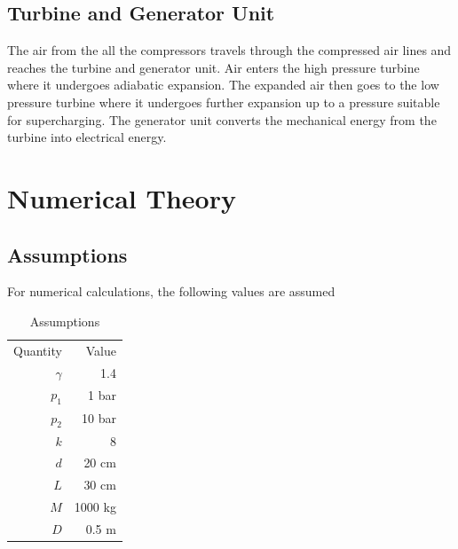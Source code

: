 \documentclass[12pt,a4paper]{article}
\begin{document}
	\subsection{Turbine and Generator Unit}
		The air from the all the compressors travels through the compressed air lines and reaches the turbine and generator unit. Air enters the high pressure turbine where it undergoes adiabatic expansion. The expanded air then goes to the low pressure turbine where it undergoes further expansion up to a pressure suitable for supercharging. The generator unit converts the mechanical energy from the turbine into electrical energy.

\section{Numerical Theory}
	\subsection{Assumptions} \label{sec:numerical_theory_assumptions}
		For numerical calculations, the following values are assumed

		\begin{table}[H]
			\centering
			\begin{tabular}{r r}
				Quantity & Value \\
				\( \gamma \) & 1.4 \\
				\( p_1 \) & 1 bar \\
				\( p_2 \) & 10 bar \\
				\( k \) & 8 \\
				\( d \) & 20 cm \\
				\( L \) & 30 cm \\
				\( M \) & 1000 kg \\
				\( D \) & 0.5 m
			\end{tabular}
			\caption{Assumptions}
			\label{tab:assumed_values}
		\end{table}
\end{document}
